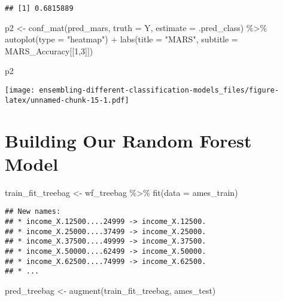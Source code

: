 \documentclass[
]{article}
\newenvironment{Shaded}{\begin{snugshade}}{\end{snugshade}}
\newcommand{\AttributeTok}[1]{\textcolor[rgb]{0.77,0.63,0.00}{#1}}
\newcommand{\DecValTok}[1]{\textcolor[rgb]{0.00,0.00,0.81}{#1}}
\newcommand{\FunctionTok}[1]{\textcolor[rgb]{0.00,0.00,0.00}{#1}}
\newcommand{\NormalTok}[1]{#1}
\newcommand{\OtherTok}[1]{\textcolor[rgb]{0.56,0.35,0.01}{#1}}
\newcommand{\SpecialCharTok}[1]{\textcolor[rgb]{0.00,0.00,0.00}{#1}}
\newcommand{\StringTok}[1]{\textcolor[rgb]{0.31,0.60,0.02}{#1}}
\begin{document}
\begin{verbatim}
## [1] 0.6815889
\end{verbatim}

\begin{Shaded}
\begin{Highlighting}[]
\NormalTok{p2 }\OtherTok{\textless{}{-}} \FunctionTok{conf\_mat}\NormalTok{(pred\_mars, }\AttributeTok{truth =}\NormalTok{ Y, }\AttributeTok{estimate =}\NormalTok{ .pred\_class) }\SpecialCharTok{\%\textgreater{}\%} 
  \FunctionTok{autoplot}\NormalTok{(}\AttributeTok{type =} \StringTok{"heatmap"}\NormalTok{) }\SpecialCharTok{+}
  \FunctionTok{labs}\NormalTok{(}\AttributeTok{title =} \StringTok{"MARS"}\NormalTok{,}
       \AttributeTok{subtitle =}\NormalTok{ MARS\_Accuracy[[}\DecValTok{1}\NormalTok{,}\DecValTok{3}\NormalTok{]])}

\NormalTok{p2}
\end{Highlighting}
\end{Shaded}

\texttt{[image: ensembling-different-classification-models\_files/figure-latex/unnamed-chunk-15-1.pdf]}

\hypertarget{building-our-random-forest-model}{%
\section{Building Our Random Forest
Model}\label{building-our-random-forest-model}}

\begin{Shaded}
\begin{Highlighting}[]
\NormalTok{train\_fit\_treebag }\OtherTok{\textless{}{-}} 
\NormalTok{  wf\_treebag }\SpecialCharTok{\%\textgreater{}\%} 
  \FunctionTok{fit}\NormalTok{(}\AttributeTok{data =}\NormalTok{ ames\_train)}
\end{Highlighting}
\end{Shaded}

\begin{verbatim}
## New names:
## * income_X.12500....24999 -> income_X.12500.
## * income_X.25000....37499 -> income_X.25000.
## * income_X.37500....49999 -> income_X.37500.
## * income_X.50000....62499 -> income_X.50000.
## * income_X.62500....74999 -> income_X.62500.
## * ...
\end{verbatim}

\begin{Shaded}
\begin{Highlighting}[]
\NormalTok{pred\_treebag }\OtherTok{\textless{}{-}} \FunctionTok{augment}\NormalTok{(train\_fit\_treebag, ames\_test)}
\end{Highlighting}
\end{Shaded}
\end{document}
